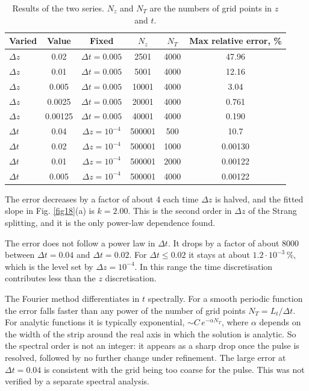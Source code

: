 \documentclass{article}
\begin{document}
    \begin{table}[H]
        \centering
        \begin{tabular}{l c c c c c}
            \hline
            Varied & Value & Fixed & \(N_z\) & \(N_T\) & Max relative error, \% \\
            \hline
            \(\Delta z\) & 0.02 & \(\Delta t = 0.005\) & 2501 & 4000 & 47.96 \\
            \(\Delta z\) & 0.01 & \(\Delta t = 0.005\) & 5001 & 4000 & 12.16 \\
            \(\Delta z\) & 0.005 & \(\Delta t = 0.005\) & 10001 & 4000 & 3.04 \\
            \(\Delta z\) & 0.0025 & \(\Delta t = 0.005\) & 20001 & 4000 & 0.761 \\
            \(\Delta z\) & 0.00125 & \(\Delta t = 0.005\) & 40001 & 4000 & 0.190 \\
            \hline
            \(\Delta t\) & 0.04 & \(\Delta z = 10^{-4}\) & 500001 & 500 & 10.7 \\
            \(\Delta t\) & 0.02 & \(\Delta z = 10^{-4}\) & 500001 & 1000 & 0.00130 \\
            \(\Delta t\) & 0.01 & \(\Delta z = 10^{-4}\) & 500001 & 2000 & 0.00122 \\
            \(\Delta t\) & 0.005 & \(\Delta z = 10^{-4}\) & 500001 & 4000 & 0.00122 \\
            \hline
        \end{tabular}
        \caption{
            Results of the two series. \(N_z\) and \(N_T\) are the numbers of grid points in \(z\) and \(t\).
        }
        \label{tab1}
    \end{table}

    The error decreases by a factor of about 4 each time \(\Delta z\) is halved, and the fitted slope in Fig. \ref{fig18}(a) is \(k = 2.00\). This is the second order in \(\Delta z\) of the Strang splitting, and it is the only power-law dependence found.

    The error does not follow a power law in \(\Delta t\). It drops by a factor of about 8000 between \(\Delta t = 0.04\) and \(\Delta t = 0.02\). For \(\Delta t \leq 0.02\) it stays at about \(1.2\cdot10^{-3}\,\%\), which is the level set by \(\Delta z = 10^{-4}\). In this range the time discretisation contributes less than the \(z\) discretisation.

    The Fourier method differentiates in \(t\) spectrally. For a smooth periodic function the error falls faster than any power of the number of grid points \(N_T = L_t/\Delta t\). For analytic functions it is typically exponential, \(\sim C\,e^{-\alpha N_T}\), where \(\alpha\) depends on the width of the strip around the real axis in which the solution is analytic. So the spectral order is not an integer: it appears as a sharp drop once the pulse is resolved, followed by no further change under refinement. The large error at \(\Delta t = 0.04\) is consistent with the grid being too coarse for the pulse. This was not verified by a separate spectral analysis.
\end{document}
